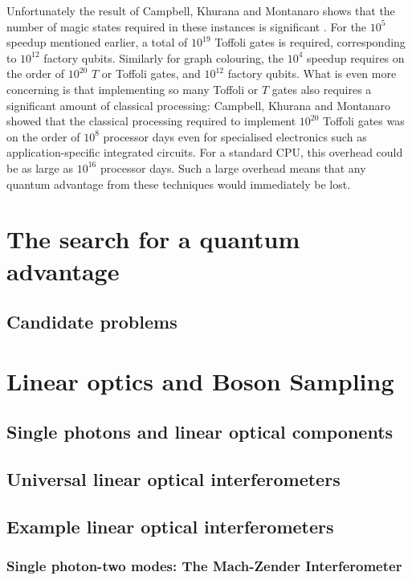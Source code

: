 Unfortunately the result of Campbell, Khurana and Montanaro shows that the number of magic states required in these instances is significant \cite{campbell2019}. For the $10^5$ speedup mentioned earlier, a total of $10^{19}$ Toffoli gates is required, corresponding to $10^{12}$ factory qubits. Similarly for graph colouring, the $10^4$ speedup requires on the order of $10^{20}$ $T$ or Toffoli gates, and $10^{12}$ factory qubits. What is even more concerning is that implementing so many Toffoli or $T$ gates also requires a significant amount of classical processing: Campbell, Khurana and Montanaro showed that the classical processing required to implement $10^{20}$ Toffoli gates was on the order of $10^8$ processor days even for specialised electronics such as application-specific integrated circuits. For a standard CPU, this overhead could be as large as $10^{16}$ processor days. Such a large overhead means that any quantum advantage from these techniques would immediately be lost.

\section{The search for a quantum advantage}

\subsection{Candidate problems}

\section{Linear optics and Boson Sampling}

\subsection{Single photons and linear optical components}

\subsection{Universal linear optical interferometers}

\subsection{Example linear optical interferometers}

\subsubsection{Single photon-two modes: The Mach-Zender Interferometer}

